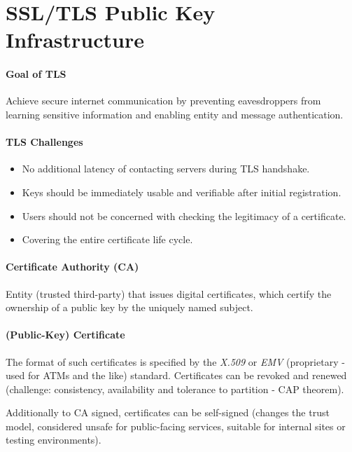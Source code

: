 \section{SSL/TLS Public Key Infrastructure}

\paragraph{Goal of TLS}
Achieve secure internet communication by preventing eavesdroppers from learning sensitive information and enabling entity and message authentication.

\paragraph{TLS Challenges}
\begin{itemize}
    \item No additional latency of contacting servers during TLS handshake.
    \item Keys should be immediately usable and verifiable after initial registration.
    \item Users should not be concerned with checking the legitimacy of a certificate.
    \item Covering the entire certificate life cycle.
\end{itemize}


\paragraph{Certificate Authority (CA)}
Entity (trusted third-party) that issues digital certificates, which certify the ownership of a public key by the uniquely named subject.

\paragraph{(Public-Key) Certificate}
The format of such certificates is specified by the \textit{X.509} or \textit{EMV} (proprietary - used for ATMs and the like) standard. Certificates can be revoked and renewed (challenge: consistency, availability and tolerance to partition - CAP theorem). 

Additionally to CA signed, certificates can be self-signed (changes the trust model, considered unsafe for public-facing services, suitable for internal sites or testing environments).

